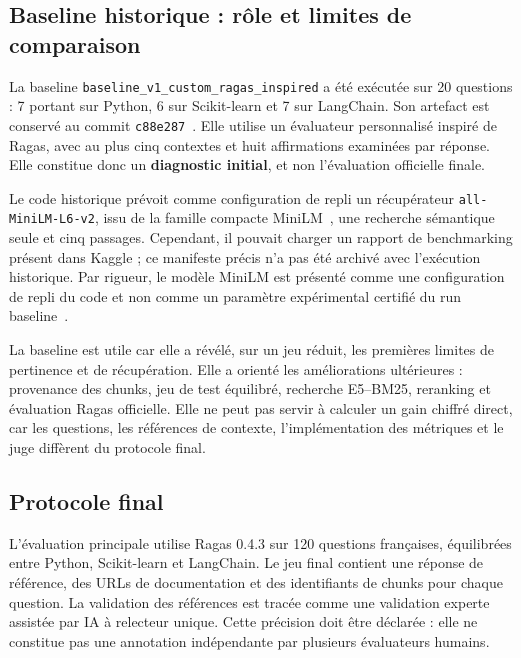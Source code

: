 \documentclass[12pt,a4paper,oneside]{report}
\begin{document}
\subsection{Baseline historique : rôle et limites de comparaison}

La baseline \texttt{baseline\_v1\_custom\_ragas\_inspired} a été exécutée sur
20 questions : 7 portant sur Python, 6 sur Scikit-learn et 7 sur LangChain. Son
artefact est conservé au commit \texttt{c88e287}~\cite{baselineArtifact,baselineCode}.
Elle utilise un évaluateur personnalisé inspiré de Ragas, avec au plus cinq
contextes et huit affirmations examinées par réponse. Elle constitue donc un
\textbf{diagnostic initial}, et non l'évaluation officielle finale.

Le code historique prévoit comme configuration de repli un récupérateur
\texttt{all-MiniLM-L6-v2}, issu de la famille compacte MiniLM~\cite{wang2020minilm},
une recherche sémantique seule et cinq passages.
Cependant, il pouvait charger un rapport de benchmarking présent dans Kaggle ;
ce manifeste précis n'a pas été archivé avec l'exécution historique. Par rigueur,
le modèle MiniLM est présenté comme une configuration de repli du code et non
comme un paramètre expérimental certifié du run baseline~\cite{baselineCode}.

La baseline est utile car elle a révélé, sur un jeu réduit, les premières limites
de pertinence et de récupération. Elle a orienté les améliorations ultérieures :
provenance des chunks, jeu de test équilibré, recherche E5--BM25, reranking et
évaluation Ragas officielle. Elle ne peut pas servir à calculer un gain chiffré
direct, car les questions, les références de contexte, l'implémentation des
métriques et le juge diffèrent du protocole final.

\subsection{Protocole final}

L'évaluation principale utilise Ragas 0.4.3 sur 120 questions françaises,
équilibrées entre Python, Scikit-learn et LangChain. Le jeu final contient une
réponse de référence, des URLs de documentation et des identifiants de chunks
pour chaque question. La validation des références est tracée comme une
validation experte assistée par IA à relecteur unique. Cette précision doit être
déclarée : elle ne constitue pas une annotation indépendante par plusieurs
évaluateurs humains.
\end{document}

